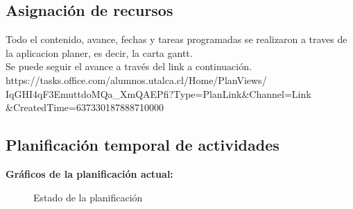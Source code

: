\subsection{Asignación de recursos}
Todo el contenido, avance, fechas y tareas programadas se realizaron a traves de la aplicacion planer, es decir, la carta gantt.\\
Se puede seguir el avance a través del link a continuación.\\
https://tasks.office.com/alumnos.utalca.cl/Home/PlanViews/\\IqGHI4qF3EmuttdoMQa\_XmQAEPfi?Type=PlanLink\&Channel=Link\\\&CreatedTime=637330187888710000
\subsection{Planificación temporal de actividades}
\textbf{Gráficos de la planificación actual:}

\begin{figure}[H]
 \centering
 \caption{Estado de la planificación}
\end{figure}